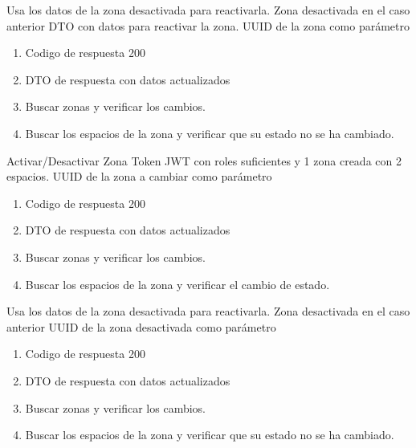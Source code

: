 {Usa los datos de la zona desactivada para reactivarla.}
{Zona desactivada en el caso anterior}
{DTO con datos para reactivar la zona. UUID de la zona como parámetro}
{\begin{enumerate} [leftmargin=*, nosep]
    \item Codigo de respuesta 200
    \item DTO de respuesta con datos actualizados
    \item Buscar zonas y verificar los cambios.
    \item Buscar los espacios de la zona y verificar que su estado no se ha cambiado.
\end{enumerate}}

{Activar/Desactivar Zona}
{Token JWT con roles suficientes y 1 zona creada con 2 espacios.}
{UUID de la zona a cambiar como parámetro}
{\begin{enumerate} [leftmargin=*, nosep]
    \item Codigo de respuesta 200
    \item DTO de respuesta con datos actualizados
    \item Buscar zonas y verificar los cambios.
    \item Buscar los espacios de la zona y verificar el cambio de estado.
\end{enumerate}}

{Usa los datos de la zona desactivada para reactivarla.}
{Zona desactivada en el caso anterior}
{UUID de la zona desactivada como parámetro}
{\begin{enumerate} [leftmargin=*, nosep]
    \item Codigo de respuesta 200
    \item DTO de respuesta con datos actualizados
    \item Buscar zonas y verificar los cambios.
    \item Buscar los espacios de la zona y verificar que su estado no se ha cambiado.
\end{enumerate}}

